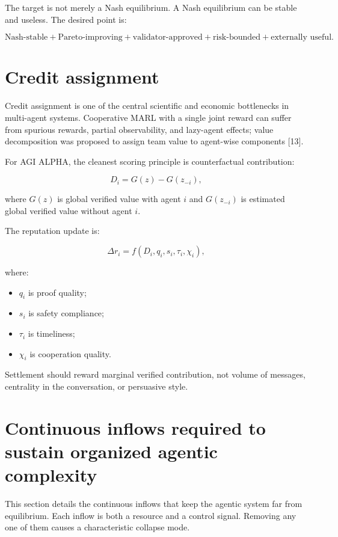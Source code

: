 \documentclass[
  11pt,
]{article}
\providecommand{\tightlist}{%
  \setlength{\itemsep}{0pt}\setlength{\parskip}{0pt}}
\begin{document}
The target is not merely a Nash equilibrium. A Nash equilibrium can be
stable and useless. The desired point is:

\[
\text{Nash-stable}+
\text{Pareto-improving}+
\text{validator-approved}+
\text{risk-bounded}+
\text{externally useful}.
\]

\section{Credit assignment}\label{credit-assignment}

Credit assignment is one of the central scientific and economic
bottlenecks in multi-agent systems. Cooperative MARL with a single joint
reward can suffer from spurious rewards, partial observability, and
lazy-agent effects; value decomposition was proposed to assign team
value to agent-wise components {[}13{]}.

For AGI ALPHA, the cleanest scoring principle is counterfactual
contribution:

\[
D_i=G(z)-G(z_{-i}),
\]

where \(G(z)\) is global verified value with agent \(i\) and
\(G(z_{-i})\) is estimated global verified value without agent \(i\).

The reputation update is:

\[
\Delta r_i=f(D_i,q_i,s_i,\tau_i,\chi_i),
\]

where:

\begin{itemize}
\tightlist
\item
  \(q_i\) is proof quality;
\item
  \(s_i\) is safety compliance;
\item
  \(\tau_i\) is timeliness;
\item
  \(\chi_i\) is cooperation quality.
\end{itemize}

Settlement should reward marginal verified contribution, not volume of
messages, centrality in the conversation, or persuasive style.

\section{Continuous inflows required to sustain organized agentic
complexity}\label{continuous-inflows-required-to-sustain-organized-agentic-complexity}

This section details the continuous inflows that keep the agentic system
far from equilibrium. Each inflow is both a resource and a control
signal. Removing any one of them causes a characteristic collapse mode.
\end{document}

